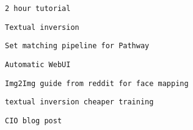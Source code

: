                
               
                \protect\hypertarget{ID_477372197}{}{}

\begin{verbatim}
2 hour tutorial
\end{verbatim}
               
             

             
             
              \protect\hypertarget{ID_890466609}{}{}

\begin{verbatim}
Textual inversion
\end{verbatim}
             

             
             
              \protect\hypertarget{ID_133452455}{}{}

\begin{verbatim}
Set matching pipeline for Pathway
\end{verbatim}
             

             
             
              \protect\hypertarget{ID_1468335947}{}{}

\begin{verbatim}
Automatic WebUI
\end{verbatim}
             

             
             
              \protect\hypertarget{ID_1110009898}{}{}

\begin{verbatim}
Img2Img guide from reddit for face mapping
\end{verbatim}
             

             
             
              \protect\hypertarget{ID_390951699}{}{}

\begin{verbatim}
textual inversion cheaper training
\end{verbatim}
             

             
             
              \protect\hypertarget{ID_325869687}{}{}

\begin{verbatim}
CIO blog post
\end{verbatim}
             

             
             
              \protect\hypertarget{ID_1718968492}{}{}

